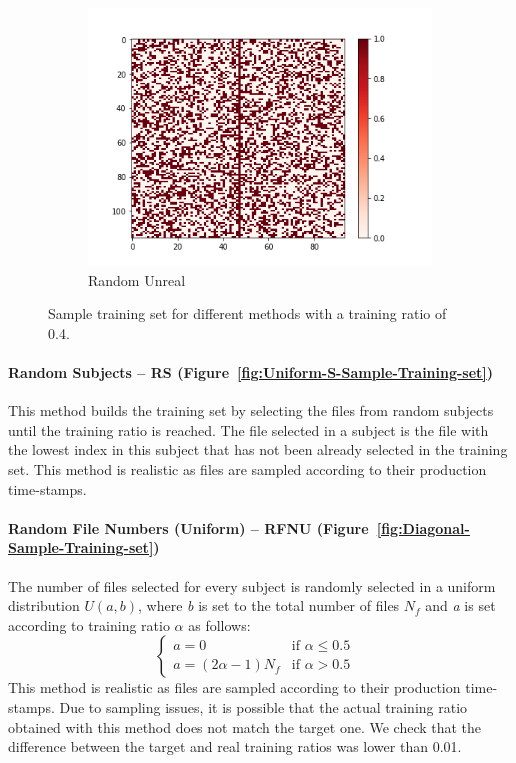 \documentclass[10pt, conference, compsocconf]{IEEEtran}
\begin{document}
\begin{figure}[h!]
\begin{subfigure}[b]{0.4\linewidth}
        \includegraphics[width=\columnwidth]{figures/5vs7_random-unreal_04_training}
                  \caption{Random Unreal}
                  \label{fig:Random-Unreal-Sample-Training-set}
        \end{subfigure}
        \caption{Sample training set for different methods with a training ratio of 0.4.}                
\end{figure}

\paragraph{Random Subjects -- RS (Figure~\ref{fig:Uniform-S-Sample-Training-set})} This method builds the 
training set by selecting the files from random subjects 
until the training ratio is reached. The file selected in a 
subject is the file with the lowest index in this subject that has not 
been already selected in the training set. This method is realistic as 
files are sampled according to their production time-stamps. 

\paragraph{Random File Numbers (Uniform) -- RFNU (Figure~\ref{fig:Diagonal-Sample-Training-set})}
The number of files selected for every subject is randomly selected in
a uniform distribution $U(\textit{a},\textit{b})$, where \textit{b} is set to the total
number of files $N_{f}$ and \textit{a} is set according to training ratio $\alpha$ as follows:
\[
  \begin{cases}
          \textit{a} = 0      & \text{if $\alpha \leq 0.5$ }\\
          
          \textit{a} = (2\alpha - 1) N_{f} & \text{if $\alpha > 0.5$}
  \end{cases}
\]
This method is realistic as files are sampled according to their production time-stamps.
Due to sampling issues, it is possible that the actual training ratio obtained with this method
does not match the target one. We check that the difference between the target and real training ratios
was lower than 0.01.\\ 
\end{document}
